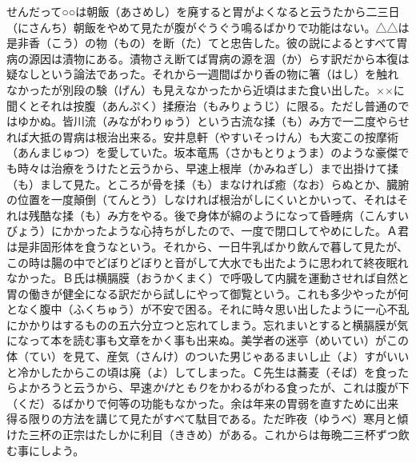 \documentclass{book}
\begin{document}
せんだって○○は朝飯（あさめし）を廃すると胃がよくなると云うたから二三日（にさんち）朝飯をやめて見たが腹がぐうぐう鳴るばかりで功能はない。△△は是非香（こう）の物（もの）を断（た）てと忠告した。彼の説によるとすべて胃病の源因は漬物にある。漬物さえ断てば胃病の源を涸（か）らす訳だから本復は疑なしという論法であった。それから一週間ばかり香の物に箸（はし）を触れなかったが別段の験（げん）も見えなかったから近頃はまた食い出した。××に聞くとそれは按腹（あんぷく）揉療治（もみりょうじ）に限る。ただし普通のではゆかぬ。皆川流（みながわりゅう）という古流な揉（も）み方で一二度やらせれば大抵の胃病は根治出来る。安井息軒（やすいそっけん）も大変この按摩術（あんまじゅつ）を愛していた。坂本竜馬（さかもとりょうま）のような豪傑でも時々は治療をうけたと云うから、早速上根岸（かみねぎし）まで出掛けて揉（も）まして見た。ところが骨を揉（も）まなければ癒（なお）らぬとか、臓腑の位置を一度顛倒（てんとう）しなければ根治がしにくいとかいって、それはそれは残酷な揉（も）み方をやる。後で身体が綿のようになって昏睡病（こんすいびょう）にかかったような心持ちがしたので、一度で閉口してやめにした。Ａ君は是非固形体を食うなという。それから、一日牛乳ばかり飲んで暮して見たが、この時は腸の中でどぼりどぼりと音がして大水でも出たように思われて終夜眠れなかった。Ｂ氏は横膈膜（おうかくまく）で呼吸して内臓を運動させれば自然と胃の働きが健全になる訳だから試しにやって御覧という。これも多少やったが何となく腹中（ふくちゅう）が不安で困る。それに時々思い出したように一心不乱にかかりはするものの五六分立つと忘れてしまう。忘れまいとすると横膈膜が気になって本を読む事も文章をかく事も出来ぬ。美学者の迷亭（めいてい）がこの体（てい）を見て、産気（さんけ）のついた男じゃあるまいし止（よ）すがいいと冷かしたからこの頃は廃（よ）してしまった。Ｃ先生は蕎麦（そば）を食ったらよかろうと云うから、早速\emph{かけ}と\emph{もり}をかわるがわる食ったが、これは腹が下（くだ）るばかりで何等の功能もなかった。余は年来の胃弱を直すために出来得る限りの方法を講じて見たがすべて駄目である。ただ昨夜（ゆうべ）寒月と傾けた三杯の正宗はたしかに利目（ききめ）がある。これからは毎晩二三杯ずつ飲む事にしよう。\\
\end{document}
